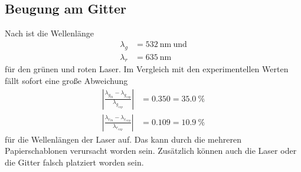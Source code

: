 \subsection{Beugung am Gitter}
Nach \cite{1} ist die Wellenlänge 
\begin{align*}
  \lambda_g&=532\ \textrm{nm}\ \textrm{und}\\
  \lambda_r&=635\ \textrm{nm}
\end{align*}
für den grünen und roten Laser. Im Vergleich mit den experimentellen Werten fällt sofort eine große Abweichung
\begin{align*}
  |\frac{\lambda_{g_{th}} - \lambda_{g_{exp}}}{\lambda_{g_{exp}}}|&=0.350=35.0\ \% \\
  |\frac{\lambda_{r_{th}} - \lambda_{r_{exp}}}{\lambda_{r_{exp}}}|&=0.109=10.9\ \%
\end{align*}
für die Wellenlängen der Laser auf. Das kann durch die mehreren Papierschablonen verursacht worden sein. Zusätzlich können auch die Laser oder die Gitter falsch platziert worden sein.

